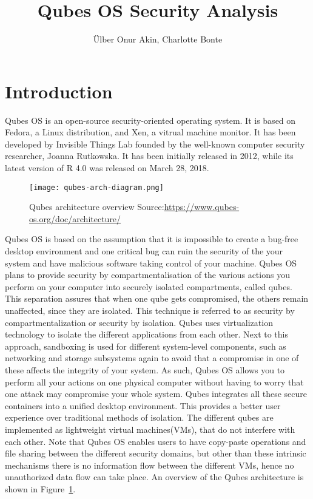 \documentclass[runningheads,a4paper]{article}
\begin{document}
\title{Qubes OS Security Analysis}

\author{\"Ulber Onur Akin, Charlotte Bonte}

\maketitle

\tableofcontents

\newpage
\section{Introduction}
Qubes OS is an open-source security-oriented operating system.  It is
based on Fedora, a Linux distribution, and Xen, a vitrual machine
monitor.  It has been developed by Invisible Things Lab founded by the
well-known computer security researcher, Joanna Rutkowska. It has been
initially released in 2012, while its latest version of R 4.0 was
released on March 28, 2018.

\begin{figure}
  \centering
  \texttt{[image: qubes-arch-diagram.png]}
  \caption{Qubes architecture overview
    Source:\protect\url{https://www.qubes-os.org/doc/architecture/}}
  \label{fig:qubesarch}
\end{figure}

Qubes OS is based on the assumption that it is impossible to create a
bug-free desktop environment and one critical bug can ruin the
security of the your system and have malicious software taking control
of your machine. Qubes OS plans to provide security by
compartmentalisation of the various actions you perform on your
computer into securely isolated compartments, called qubes.  This
separation assures that when one qube gets compromised, the others
remain unaffected, since they are isolated.  This technique is
referred to as security by compartmentalization or security by
isolation.  Qubes uses virtualization technology to isolate the
different applications from each other. Next to this approach,
sandboxing is used for different system-level components, such as
networking and storage subsystems again to avoid that a compromise in
one of these affects the integrity of your system. As such, Qubes OS
allows you to perform all your actions on one physical computer
without having to worry that one attack may compromise your whole
system. Qubes integrates all these secure containers into a unified
desktop environment. This provides a better user experience over
traditional methods of isolation. The different qubes are implemented
as lightweight virtual machines(VMs), that do not interfere with each
other.  Note that Qubes OS enables users to have copy-paste operations
and file sharing between the different security domains, but other
than these intrinsic mechanisms there is no information flow between
the different VMs, hence no unauthorized data flow can take place. An
overview of the Qubes architecture is shown in
Figure~\ref{fig:qubesarch}.
\end{document}
